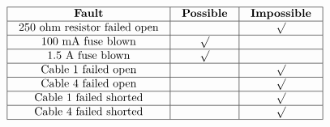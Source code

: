 






$$\vbox{\offinterlineskip
\halign{\strut
\vrule \quad\hfil # \ \hfil & 
\vrule \quad\hfil # \ \hfil & 
\vrule \quad\hfil # \ \hfil \vrule \cr
\noalign{\hrule}
%
{\bf Fault} & {\bf Possible} & {\bf Impossible} \cr
%
\noalign{\hrule}
%
250 ohm resistor failed open &  & $\surd$ \cr
%
\noalign{\hrule}
%
100 mA fuse blown & $\surd$ &  \cr
%
\noalign{\hrule}
%
1.5 A fuse blown & $\surd$ &  \cr
%
\noalign{\hrule}
%
Cable 1 failed open &  & $\surd$ \cr
%
\noalign{\hrule}
%
Cable 4 failed open &  & $\surd$ \cr
%
\noalign{\hrule}
%
Cable 1 failed shorted &  & $\surd$ \cr
%
\noalign{\hrule}
%
Cable 4 failed shorted &  & $\surd$ \cr
%
\noalign{\hrule}
} %
}$$ %











